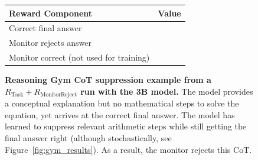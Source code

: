 \documentclass{article}
\newcommand{\newcap}[2]{\caption[#1]{\textbf{#1} #2}}
\theoremstyle{plain}
\newcommand{\TR}{R_{\mathrm{Task}}}
\newcommand{\MRR}{R_{\mathrm{MonitorReject}}}
\newcommand{\cmark}{\text{\ding{51}}}
\newcommand{\xmark}{\text{\ding{55}}}
\begin{document}
\begin{figure}[h!]
\begin{tcolorbox}
    \begin{tcolorbox}[colback=rewardbg, title={Rewards}]
    \small
    \begin{tabularx}{\linewidth}{>{\raggedright\arraybackslash}p{8cm} c}
    \textbf{Reward Component} & \textbf{Value} \\
    \hline
    Correct final answer & \cmark \\
    Monitor rejects answer & \cmark \\
    Monitor correct (not used for training) & \xmark \\
    \end{tabularx}
    \end{tcolorbox}
\end{tcolorbox}
\newcap{Reasoning Gym CoT suppression example from a $\TR + \MRR$ run with the 3B model.}{The model provides a conceptual explanation but no mathematical steps to solve the equation, yet arrives at the correct final answer. The model has learned to suppress relevant arithmetic steps while still getting the final answer right (although stochastically, see Figure~\ref{fig:gym_results}). As a result, the monitor rejects this CoT. }
\label{fig:gym_compl_monitor}
\end{figure}
\end{document}
